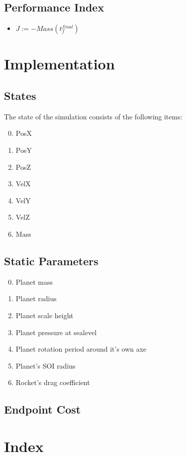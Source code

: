 \documentclass[11pt]{report}
\begin{document}
\section{Performance Index}

\begin{itemize}
\item $J := - Mass(t_f^{final})$
\end{itemize}

\chapter{Implementation}

\section{States}

The state of the simulation consists of the following items:

\begin{enumerate}
\setcounter{enumi}{-1}
\item PosX
\item PosY
\item PosZ
\item VelX
\item VelY
\item VelZ
\item Mass
\end{enumerate}

\section{Static Parameters}

\begin{enumerate}
\setcounter{enumi}{-1}
\item Planet mass
\item Planet radius
\item Planet scale height
\item Planet pressure at sealevel
\item Planet rotation period around it's own axe
\item Planet's SOI radius
\item Rocket's drag coefficient
\end{enumerate}

\section{Endpoint Cost}



\chapter{Index}
\printindex
\end{document}
